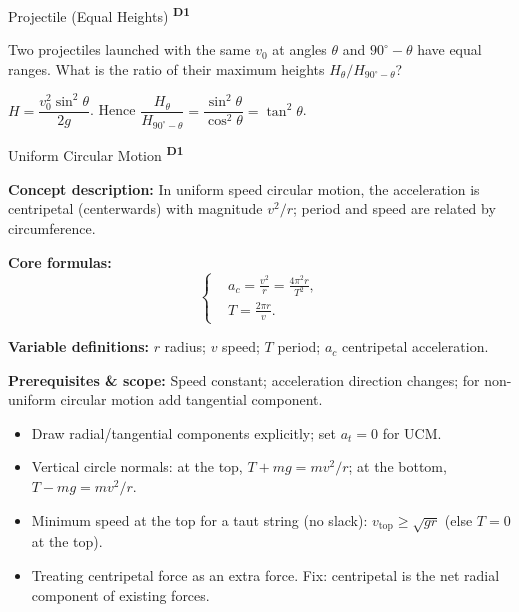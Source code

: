 ﻿\documentclass[12pt,a4paper]{article}
\providecommand{\KPFormulas}{}
\providecommand{\KPHeuristics}{}
\newcommand{\DOne}{\texorpdfstring{\textsuperscript{\textbf{D1}}}{ D1}}
\begin{document}
\begin{KnowledgePoint}{Projectile (Equal Heights) \DOne}
  \begin{cheatproblem}
  Two projectiles launched with the same $v_0$ at angles $\theta$ and $90^\circ-\theta$ have equal ranges. What is the ratio of their maximum heights $H_\theta/H_{90^\circ-\theta}$?
  \begin{solutionbox}
  $H=\dfrac{v_0^2\sin^2\theta}{2g}$. Hence $\dfrac{H_\theta}{H_{90^\circ-\theta}}=\dfrac{\sin^2\theta}{\cos^2\theta}=\tan^2\theta$.
  \end{solutionbox}
  \end{cheatproblem}
\end{KnowledgePoint}

\begin{KnowledgePoint}{Uniform Circular Motion \DOne}
  \KPFormulas
  \begin{formulabox}
  \textbf{Concept description:} In uniform speed circular motion, the acceleration is centripetal (centerwards) with magnitude $v^2/r$; period and speed are related by circumference.

  \textbf{Core formulas:}
  \[
  \left\{\begin{aligned}
    &a_c=\frac{v^2}{r}=\frac{4\pi^2 r}{T^2},\\
    &T=\frac{2\pi r}{v}.
  \end{aligned}\right.
  \]

  \textbf{Variable definitions:} $r$ radius; $v$ speed; $T$ period; $a_c$ centripetal acceleration.

  \textbf{Prerequisites \& scope:} Speed constant; acceleration direction changes; for non-uniform circular motion add tangential component.
  \end{formulabox}

  \KPHeuristics
  \begin{heuristicsbox}
  \begin{itemize}[leftmargin=*]
    \item Draw radial/tangential components explicitly; set $a_t=0$ for UCM.
    \item Vertical circle normals: at the top, $T+mg=mv^2/r$; at the bottom, $T-mg=mv^2/r$.
    \item Minimum speed at the top for a taut string (no slack): $v_{\text{top}}\ge \sqrt{gr}$ (else $T=0$ at the top).
  \end{itemize}
  \vspace{0.4em}
  \begin{itemize}[leftmargin=*]
    \item Treating centripetal force as an extra force. Fix: centripetal is the net radial component of existing forces.
  \end{itemize}
  \end{heuristicsbox}


\end{KnowledgePoint}
\end{document}

